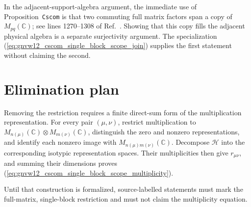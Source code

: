 \documentclass{article}
\begin{document}
In the adjacent-support-algebra argument, the immediate use of
Proposition~\texttt{Cscom} is that two commuting full matrix factors span a
copy of $M_{pq}(\mathbb C)$; see lines 1270--1308 of
Ref.~\cite{Gross2012IndexTheory}. Showing that this copy fills the adjacent
physical algebra is a separate surjectivity argument. The specialization
(\ref{eq:gnvw12_cscom_single_block_scope_join}) supplies the first statement
without claiming the second.

\section{Elimination plan}

Removing the restriction requires a finite direct-sum form of the
multiplication representation. For every pair $(\mu,\nu)$, restrict
multiplication to
$M_{n(\mu)}(\mathbb C)\otimes M_{m(\nu)}(\mathbb C)$, distinguish the zero and
nonzero representations, and identify each nonzero image with
$M_{n(\mu)m(\nu)}(\mathbb C)$. Decompose $\mathcal H$ into the corresponding
isotypic representation spaces. Their multiplicities then give
$r_{\mu\nu}$, and summing their dimensions proves
(\ref{eq:gnvw12_cscom_single_block_scope_multiplicity}).

Until that construction is formalized, source-labelled statements must mark
the full-matrix, single-block restriction and must not claim the multiplicity
equation.



\end{document}
